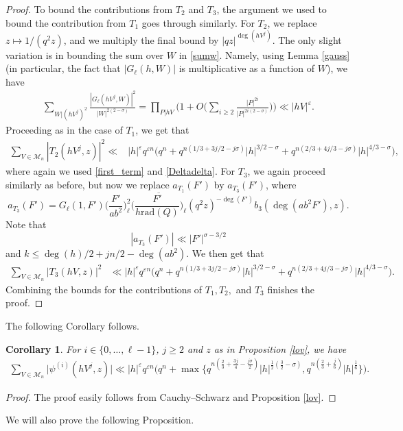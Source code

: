 \documentclass[12pt]{amsart}
\newtheorem{corollary}[theorem]{Corollary}
\begin{document}
\begin{proof}
 To bound the contributions from $T_2$ and $T_3$, the argument we used to bound the contribution from $T_1$ goes through similarly. For $T_2$, we replace $z \mapsto 1/(q^2z)$, and we multiply the final bound by $|qz|^{\deg(hV^j)}$. The only slight variation is in bounding the sum over $W$ in \eqref{sumw}. Namely, using Lemma \ref{gauss} (in particular, the fact that $|G_{\ell}(h,W)|$ is multiplicative as a function of $W$), we have
 \begin{align*}
 \sum_{W|(hV^j)^2} \frac{|G_{\ell}(hV^j,W)|^2}{|W|^{2(2-\sigma)}}  = \prod_{P|hV} \Big( 1+  O \Big(\sum_{i \geq 2} \frac{ |P|^{2i}}{|P|^{2i(2-\sigma)}} \Big)\Big) \ll |hV|^{\varepsilon}.
 \end{align*}
 Proceeding as in the case of $T_1$, we get that
 \begin{align*}
\sum_{V \in \mathcal{M}_n} |T_2(hV^j,z)|^2 \ll& |h|^{\varepsilon} q^{\varepsilon n} \Big( q^n +q^{n(1/3+3j/2-j\sigma)}|h|^{3/2-\sigma}+q^{n(2/3+4j/3-j\sigma)}|h|^{4/3-\sigma}\Big),
 \end{align*}
 where again we used \eqref{first_term} and \eqref{Deltadelta}.
 For $T_3$, we again proceed similarly as before, but now we replace $a_{T_1}(F')$ by $a_{T_3}(F')$, where
 $$a_{T_3}(F') = G_{\ell}(1,F') \Big(  \frac{F'}{ab^2}\Big)_{\ell}^2 \overline{\Big( \frac{F'}{h \text{rad}(Q)}\Big)_{\ell} } (q^2z)^{-\deg(F')} b_3(\deg(ab^2F'),z).$$
 Note that \[|a_{T_3}(F')| \ll |F'|^{\sigma -3/2}\] and $k  \leq \deg(h)/2+jn/2-\deg(ab^2)$. We then get that
 \begin{align*}
\sum_{V \in \mathcal{M}_n} |T_3(hV,z)|^2 &\ll |h|^{\varepsilon} q^{\varepsilon n} \Big( q^n +q^{n(1/3+3j/2-j\sigma)}|h|^{3/2-\sigma}+q^{n(2/3+4j/3-j\sigma)}|h|^{4/3-\sigma}\Big).
 \end{align*}
 Combining the bounds for the contributions of $T_1, T_2,$ and $T_3$ finishes the proof.
 \end{proof}
The following Corollary follows.
\begin{corollary}
\label{cor_lov}
For $i \in \{0,\ldots,\ell-1\}$, $j \geq 2$ and $z$ as in Proposition \ref{lov}, we have
\begin{align*}
 \sum_{V \in \mathcal{M}_n} \Big|  \psi^{(i)}(hV^j,z)\Big| \ll |h|^{\varepsilon} q^{\varepsilon n} \Big(q^n + \max \{ q^{n(\frac{2}{3} + \frac{3j}{4} - \frac{j \sigma}{2})} |h|^{\frac{1}{2} (\frac{3}{2}-\sigma)}, q^{n (\frac{2}{3}+\frac{j}{6})} |h|^{\frac{1}{6}}\} \Big).
 \end{align*}
\end{corollary}  
 \begin{proof}
 The proof easily follows from Cauchy--Schwarz and Proposition \ref{lov}.
 \end{proof}
 We will also prove the following Proposition.
 
\end{document}
